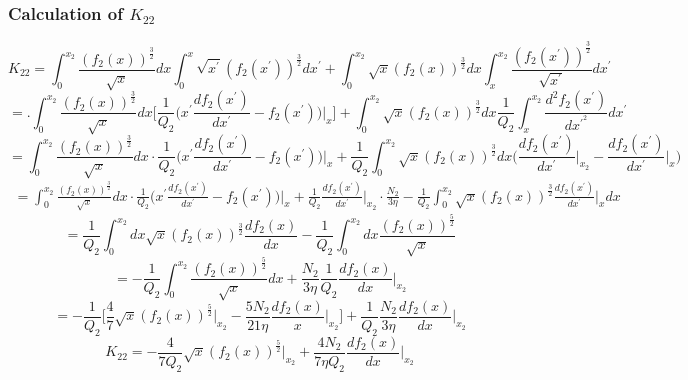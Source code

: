 \documentclass[fleqn, 10pt]{article}
\begin{document}
\subsubsection{Calculation of $K_{22}$} 
 \begin{equation}
     K_{22} = \int^{x_{2}}_{0} \frac{(f_{2}(x))^\frac{3}{2}}{\sqrt{x}}dx \int^{x}_{0} \sqrt{x^\prime}(f_{2}(x^\prime))^\frac{3}{2}dx^{\prime} + \int^{x_{2}}_{0} \sqrt{x} (f_{2}(x))^\frac{3}{2}dx \int^{x_{2}}_{x} \frac{(f_{2}(x^\prime))^\frac{3}{2}}{\sqrt{x^\prime}} dx^\prime
 \end{equation}
 \begin{equation*}
     = \biggl. \int^{x_{2}}_{0} \frac{(f_{2}(x))^\frac{3}{2}}{\sqrt{x}} dx \biggl[ \frac{1}{Q_{2}}\biggl(x^\prime \frac{df_{2}(x^\prime)}{dx^{\prime}} - f_{2}(x^\prime) \biggr)\biggr|_{x}\biggr] + \int^{x_{2}}_{0}\sqrt{x} (f_{2}(x))^\frac{3}{2} dx \frac{1}{Q_{2}} \int^{x_{2}}_{x} \frac{d^{2}f_{2}(x^\prime)}{dx^{\prime^2}}dx^{\prime}
 \end{equation*}
 \begin{equation*}
     = \int^{x_{2}}_{0} \frac{(f_{2}(x))^\frac{3}{2}}{\sqrt{x}}dx \cdot \frac{1}{Q_{2}}\biggl( x^\prime\frac{df_{2}(x^\prime)}{dx^\prime} - f_{2}(x^\prime)   \biggr) \Bigg|_{x}+ \frac{1}{Q_{2}} \int^{x_{2}}_{0} \sqrt{x} (f_{2}(x))^\frac{3}{2} dx \biggl( \frac{df_{2}(x^\prime)}{dx^\prime}\biggr|_{x_{2}} - \frac{df_{2}(x^\prime)}{dx^{\prime}}\biggr|_{x}\biggr)
 \end{equation*}
\begin{equation*}
\begin{split}
   = \int^{x_{2}}_{0} \frac{(f_{2}(x))^\frac{3}{2}}{\sqrt{x}} dx \cdot \frac{1}{Q_{2}}\biggl( x^{\prime} \frac{df_{2}(x^\prime)}{dx^{\prime}} - f_{2}(x^\prime)\biggr)\biggr|_{x} + \frac{1}{Q_{2}} \frac{df_{2}(x^\prime)}{dx^{\prime}}\biggr|_{x_{2}} \cdot\frac{N_{2}}{3\eta}  - \frac{1}{Q_{2}} \int^{x_{2}}_{0} \sqrt{x} (f_{2}(x))^\frac{3}{2} \frac{df_{2}(x^\prime)}{dx^{\prime}} \biggr|_{x} dx
   \end{split}
\end{equation*}
\begin{equation*}
    = \frac{1}{Q_{2}} \int^{x_{2}}_{0} dx \sqrt{x} (f_{2}(x))^\frac{3}{2} \frac{df_{2}(x)}{dx} - \frac{1}{Q_{2}} \int^{x_{2}}_{0} dx \frac{(f_{2}(x))^\frac{5}{2}}{\sqrt{x}}
\end{equation*}
\begin{equation*}
    = - \frac{1}{Q_{2}}\int^{x_{2}}_{0}\frac{(f_{2}(x))^\frac{5}{2}}{\sqrt{x}}dx + \frac{N_{2}}{3\eta} \frac{1}{Q_{2}}\frac{df_{2}(x)}{dx}\biggr|_{x_{2}}
\end{equation*}
\begin{equation*}
    = - \frac{1}{Q_{2}}   \biggl[ \frac{4}{7}\sqrt{x} (f_{2}(x))^\frac{5}{2} \Bigg|_{x_{2}} - \frac{5 N_{2}}{21 \eta} \frac{df_{2}(x)}{x}\biggr|_{x_{2}}\biggr] + \frac{1}{Q_{2}} \frac{N_{2}}{3 \eta} \frac{df_{2}(x)}{dx} \biggr|_{x_{2}}
\end{equation*}
\begin{equation}
   K_{22} = -   \frac{4}{7Q_{2}} \sqrt{x} (f_{2}(x))^\frac{5}{2} \Bigg|_{x_{2}} + \frac{4 N_{2}}{7 \eta Q_{2}} \frac{df_{2}(x)}{dx}\biggr|_{x_{2}}
\end{equation}
\end{document}

